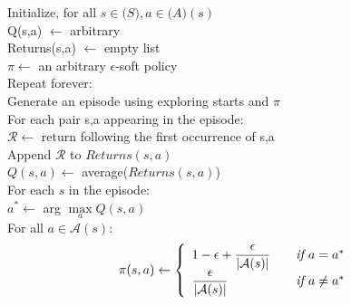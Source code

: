 \documentclass{article}
\newcommand{\tab}{\hspace{10mm}}
\newcommand{\dtab}{\hspace{20mm}}
\newcommand{\ttab}{\hspace{30mm}}
\newcommand{\qtab}{\hspace{40mm}}
\begin{document}
 
\begin{center}
\begin{mdframed}
\begin{algorithm}[H]
Initialize, for all $s \in \mathcal(S), a \in \mathcal(A)(s)$\\
\tab Q(s,a) $\leftarrow$ arbitrary \\
\tab Returns(s,a) $\leftarrow$ empty list \\
\tab $\pi \leftarrow$ an arbitrary $\epsilon$-soft policy \\
 
Repeat forever:\\
\tab Generate an episode using exploring starts and $\pi$\\
\tab For each pair s,a appearing in the episode:\\
\dtab $\mathcal{R} \leftarrow $ return following the first occurrence of s,a\\
\ttab Append $\mathcal{R}$ to $Returns(s,a)$\\
\ttab $Q(s,a) \leftarrow$ average($Returns(s,a)$)\\
\dtab For each $s$ in the episode:\\
\ttab $a^* \leftarrow$ arg $\max\limits_a Q(s,a)$\\
\ttab For all $a \in \mathcal{A}(s)$:\\

\qtab \[\pi(s,a) \leftarrow \left \{
\begin{array}{l l}
1-\epsilon + \dfrac{\epsilon}{|\mathcal{A}(s)|} & \quad \textit{if } a = a^* \\
\dfrac{\epsilon}{|\mathcal{A}(s)|} & \quad \textit{if } a \neq a^*
\end{array}\right.\]
\end{algorithm}
\end{mdframed}
\label{alg:OPMCC}
\end{center}
\end{document}
